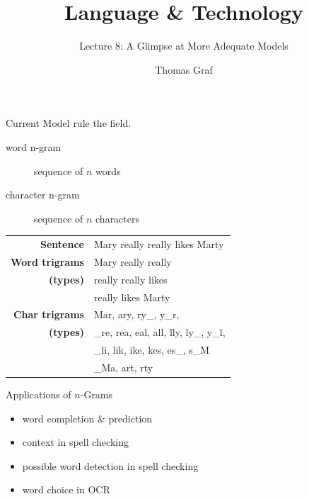 \documentclass[xcolor={usenames,svgnames,x11names,dvipsnames,table}]{beamer}
\title{\texorpdfstring{Language \& Technology}{Language and Technology}}
\subtitle{Lecture 8: A Glimpse at More Adequate Models}
\author{Thomas Graf}
\institute{Stony Brook University\\\texttt{lin120@thomasgraf.net}}
\date{}
\begin{document}
\unnumbered{
\begin{frame}
	\titlepage
\end{frame}
}

\begin{frame}{Current Model}
     rule the field.
    \begin{description}
        \item[word n-gram] sequence of $n$ words
        \item[character n-gram] sequence of $n$ characters
    \end{description}
    \begin{example}
        \begin{tabular}{rl}
            \textbf{Sentence} & Mary really really likes Marty\\[12pt]
            \textbf{Word trigrams} & Mary really really\\
            \textbf{(types)}       & really really likes\\
                                   & really likes Marty\\[12pt]
            \textbf{Char trigrams} & Mar, ary, ry\_, y\_r,\\
            \textbf{(types)}       & \_re, rea, eal, all, lly, ly\_, y\_l,\\
                                   & \_li, lik, ike, kes, es\_, s\_M\\
                                   & \_Ma, art, rty
        \end{tabular}
    \end{example}
\end{frame}

\begin{frame}{Applications of $n$-Grams}
    \begin{itemize}
        \item word completion \& prediction
        \item context in spell checking\\
        \item possible word detection in spell checking\\
        \item word choice in OCR\\
    \end{itemize}
\end{frame}
\end{document}
